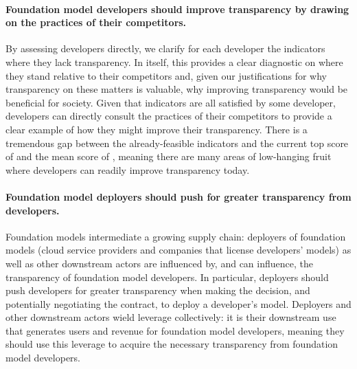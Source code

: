 \documentclass[screen, authorversion, acmsmall]{acmart}
\begin{document}
\paragraph{Foundation model developers should improve transparency by drawing on the practices of their competitors.}
By assessing developers directly, we clarify for each developer the indicators where they lack transparency.
In itself, this provides a clear diagnostic on where they stand relative to their competitors and, given our justifications for why transparency on these matters is valuable, why improving transparency would be beneficial for society.
Given that \numfeasible indicators are all satisfied by some developer, developers can directly consult the practices of their competitors to provide a clear example of how they might improve their transparency.
There is a tremendous gap between the \numfeasible already-feasible indicators and the current top score of \maxscore and the mean score of \meanscore, meaning there are many areas of low-hanging fruit where developers can readily improve transparency today. 

\paragraph{Foundation model deployers should push for greater transparency from developers.}
Foundation models intermediate a growing supply chain: deployers of foundation models (\eg cloud service providers and companies that license developers' models) as well as other downstream actors are influenced by, and can influence, the transparency of foundation model developers.
In particular, deployers should push developers for greater transparency when making the decision, and potentially negotiating the contract, to deploy a developer's model.
Deployers and other downstream actors wield leverage collectively: it is their downstream use that generates users and revenue for foundation model developers, meaning they should use this leverage to acquire the necessary transparency from foundation model developers.
\end{document}
